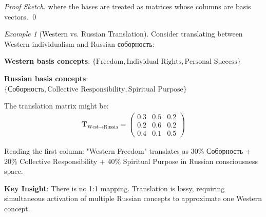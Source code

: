 \documentclass[11pt,a4paper]{article}
\theoremstyle{definition}
\theoremstyle{remark}
\newtheorem{example}{Example}[section]
\newcommand{\TT}{\mathbf{T}}
\begin{document}
\begin{small}
\begin{proof}[Proof Sketch]
where the bases are treated as matrices whose columns are basis vectors. \qed
\end{proof}

\begin{example}[Western vs. Russian Translation]
Consider translating between Western individualism and Russian соборность:

\textbf{Western basis concepts}: \(\{\text{Freedom}, \text{Individual Rights}, \text{Personal Success}\}\)

\textbf{Russian basis concepts}: \(\{\text{Соборность}, \text{Collective Responsibility}, \text{Spiritual Purpose}\}\)

The translation matrix might be:
\begin{align}
\TT_{\text{West} \to \text{Russia}} = \begin{pmatrix}
0.3 & 0.5 & 0.2 \\
0.2 & 0.6 & 0.2 \\
0.4 & 0.1 & 0.5
\end{pmatrix}
\end{align}

Reading the first column: "Western Freedom" translates as 30\% Соборность + 20\% Collective Responsibility + 40\% Spiritual Purpose in Russian consciousness space.

\textbf{Key Insight}: There is no 1:1 mapping. Translation is lossy, requiring simultaneous activation of multiple Russian concepts to approximate one Western concept.
\end{example}


\end{small}
\end{document}
